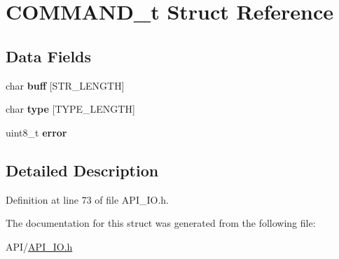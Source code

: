 \hypertarget{struct_c_o_m_m_a_n_d__t}{}\section{C\+O\+M\+M\+A\+N\+D\+\_\+t Struct Reference}
\label{struct_c_o_m_m_a_n_d__t}
\subsection*{Data Fields}
\begin{DoxyCompactItemize}
\item 
\mbox{\label{struct_c_o_m_m_a_n_d__t_a3ca56d05670fa13929584cd8aebae252}} 
char {\bfseries buff} \mbox{[}S\+T\+R\+\_\+\+L\+E\+N\+G\+TH\mbox{]}
\item 
\mbox{\label{struct_c_o_m_m_a_n_d__t_a106c2825d202a4530656fcd385d0c04b}} 
char {\bfseries type} \mbox{[}T\+Y\+P\+E\+\_\+\+L\+E\+N\+G\+TH\mbox{]}
\item 
\mbox{\label{struct_c_o_m_m_a_n_d__t_adc64ccb7538429fe78e3fe0139267370}} 
uint8\+\_\+t {\bfseries error}
\end{DoxyCompactItemize}


\subsection{Detailed Description}


Definition at line 73 of file A\+P\+I\+\_\+\+I\+O.\+h.



The documentation for this struct was generated from the following file\+:\begin{DoxyCompactItemize}
\item 
A\+P\+I/\hyperlink{_a_p_i___i_o_8h}{A\+P\+I\+\_\+\+I\+O.\+h}\end{DoxyCompactItemize}
